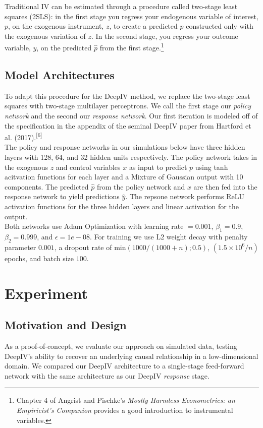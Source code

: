 \documentclass[10.5pt, oneside, twocolumn]{article}   	%
\begin{document}
Traditional IV can be estimated through a procedure called two-stage least squares (2SLS): in the first stage you regress your endogenous variable of interest, $p$,  on the exogenous instrument, $z$, to create a predicted $\hat{p}$ constructed only with the exogenous variation of $z$. In the second stage, you regress your outcome variable, $y$, on the predicted $\hat{p}$ from the first stage.\footnote{Chapter 4 of Angrist and Pischke's \emph{Mostly Harmless Econometrics: an Empiricist's Companion} provides a good introduction to instrumental variables.}\\

\subsection{Model Architectures}

To adapt this procedure for the DeepIV method, we replace the two-stage least squares with two-stage multilayer perceptrons. We call the first stage our \emph{policy network} and the second our \emph{response network}. Our first iteration is modeled off of the specification in the appendix of the seminal DeepIV paper from Hartford et al. (2017).\textsuperscript{[6]}\\

The policy and response networks in our simulations below have three hidden layers with 128, 64, and 32 hidden units respectively. The policy network takes in the exogenous $z$ and control variables $x$ as input to predict $p$ using tanh acitvation functions for each layer and a Mixture of Gaussian output with 10 components. The predicted $\hat{p}$ from the policy network and $x$ are then fed into the response network to yield predictions $\hat{y}$. The repsone network performs ReLU activation functions for the three hidden layers and linear activation for the output. \\

Both networks use Adam Optimization with learning rate $=0.001$, $\beta_1 = 0.9$, $\beta_2 = 0.999$, and $\epsilon = 1e-08$. For training we use L2 weight decay with penalty parameter $0.001$, a dropout rate of $\textrm{min}(1000/(1000+n); 0.5)$, $(1.5 \times 10^6/n)$ epochs, and batch size $100$. 


\section{Experiment}
\subsection{Motivation and Design}
As a proof-of-concept, we evaluate our approach on simulated data, testing DeepIV's ability to recover an underlying causal relationship in a low-dimensional domain. We compared our DeepIV architecture to a single-stage feed-forward network with the same architecture as our  DeepIV \emph{response} stage. 
\end{document}

